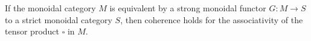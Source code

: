 If the monoidal category $M$ is equivalent by a strong monoidal functor $G : M \rightarrow S$ to a strict monoidal category $S$, then coherence holds for the associativity of the tensor product $\square$ in $M$.
